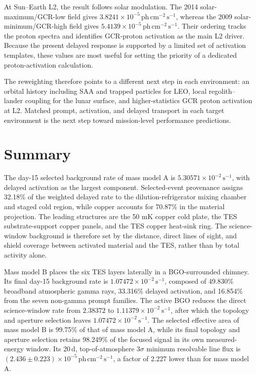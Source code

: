 \documentclass[11pt]{article}
\newcommand{\phcms}{\ensuremath{\,\mathrm{ph\,cm^{-2}\,s^{-1}}}}
\newcommand{\cps}{\ensuremath{\,\mathrm{s^{-1}}}}
\begin{document}
At Sun--Earth L2, the result follows solar modulation. The 2014
solar-maximum/GCR-low field gives $3.8241\times10^{-5}\phcms$, whereas the 2009
solar-minimum/GCR-high field gives $5.4139\times10^{-5}\phcms$. Their ordering
tracks the proton spectra and identifies GCR-proton activation as the main L2
driver. Because the present delayed response is supported by a limited set of
activation templates, these values are most useful for setting the priority of
a dedicated proton-activation calculation.

The reweighting therefore points to a different next step in each environment:
an orbital history including SAA and trapped particles for LEO, local
regolith--lander coupling for the lunar surface, and higher-statistics GCR
proton activation at L2. Matched prompt, activation, and delayed transport in
each target environment is the next step toward mission-level performance
predictions.

\FloatBarrier

\section{Summary}
\label{sec:summary}

The day-15 selected background rate of mass model A is
$5.30571\times10^{-2}\cps$, with delayed activation as the largest component.
Selected-event provenance assigns 32.18\% of the weighted delayed rate to the
dilution-refrigerator mixing chamber and staged cold region, while copper
accounts for 70.87\% in the material projection. The leading structures are the
50 mK copper cold plate, the TES substrate-support copper panels, and the TES
copper heat-sink ring. The science-window background is therefore set by the
distance, direct lines of sight, and shield coverage between activated material
and the TES, rather than by total activity alone.

Mass model B places the six TES layers laterally in a BGO-surrounded chimney.
Its final day-15 background rate is $1.07472\times10^{-2}\cps$, composed of
49.830\% broadband atmospheric gamma rays, 33.316\% delayed activation, and
16.854\% from the seven non-gamma prompt families. The active BGO reduces the
direct science-window rate from $2.38372$ to
$1.11379\times10^{-2}\cps$, after which the topology and aperture selection
leaves $1.07472\times10^{-2}\cps$. The selected effective area of mass model B
is 99.75\% of that of mass model A, while its final topology and aperture
selection retains 98.249\% of the focused signal in its own measured-energy
window. Its 20\,d, top-of-atmosphere $3\sigma$ minimum resolvable line flux is
$(2.436\pm0.223)\times10^{-5}\phcms$, a factor of 2.227 lower than for mass
model A.
\end{document}
